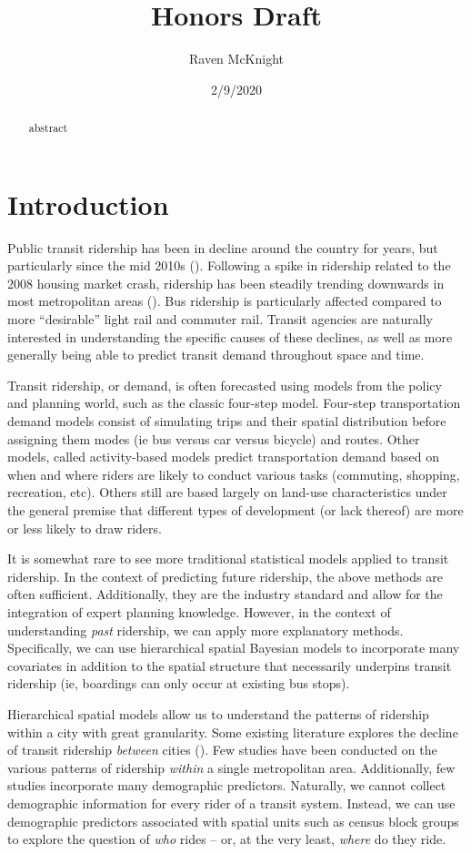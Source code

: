 \documentclass[
]{article}
\title{Honors Draft}
\author{Raven McKnight}
\date{2/9/2020}
\begin{document}
\maketitle
\begin{abstract}
abstract
\end{abstract}

\hypertarget{introduction}{%
\section{Introduction}\label{introduction}}

Public transit ridership has been in decline around the country for
years, but particularly since the mid 2010s (). Following a spike in
ridership related to the 2008 housing market crash, ridership has been
steadily trending downwards in most metropolitan areas (). Bus ridership
is particularly affected compared to more ``desirable'' light rail and
commuter rail. Transit agencies are naturally interested in
understanding the specific causes of these declines, as well as more
generally being able to predict transit demand throughout space and
time.

Transit ridership, or demand, is often forecasted using models from the
policy and planning world, such as the classic four-step model.
Four-step transportation demand models consist of simulating trips and
their spatial distribution before assigning them modes (ie bus versus
car versus bicycle) and routes. Other models, called activity-based
models predict transportation demand based on when and where riders are
likely to conduct various tasks (commuting, shopping, recreation, etc).
Others still are based largely on land-use characteristics under the
general premise that different types of development (or lack thereof)
are more or less likely to draw riders.

It is somewhat rare to see more traditional statistical models applied
to transit ridership. In the context of predicting future ridership, the
above methods are often sufficient. Additionally, they are the industry
standard and allow for the integration of expert planning knowledge.
However, in the context of understanding \emph{past} ridership, we can
apply more explanatory methods. Specifically, we can use hierarchical
spatial Bayesian models to incorporate many covariates in addition to
the spatial structure that necessarily underpins transit ridership (ie,
boardings can only occur at existing bus stops).

Hierarchical spatial models allow us to understand the patterns of
ridership within a city with great granularity. Some existing literature
explores the decline of transit ridership \emph{between} cities (). Few
studies have been conducted on the various patterns of ridership
\emph{within} a single metropolitan area. Additionally, few studies
incorporate many demographic predictors. Naturally, we cannot collect
demographic information for every rider of a transit system. Instead, we
can use demographic predictors associated with spatial units such as
census block groups to explore the question of \emph{who} rides -- or,
at the very least, \emph{where} do they ride.
\end{document}
